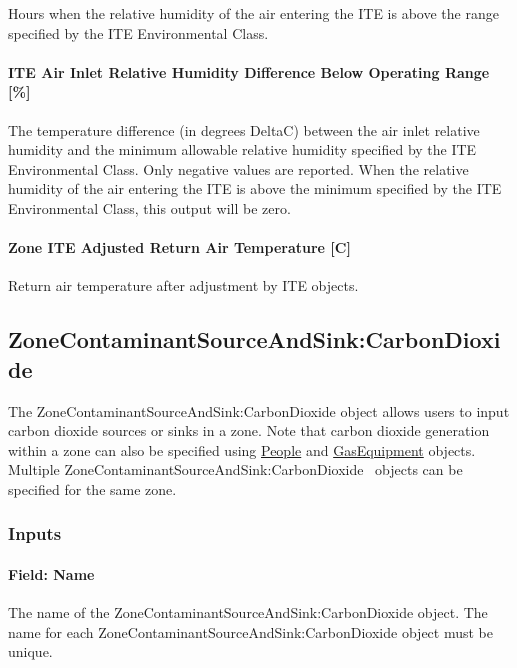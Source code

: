 Hours when the relative humidity of the air entering the ITE is above the range specified by the ITE Environmental Class.

\paragraph{ITE Air Inlet Relative Humidity Difference Below Operating Range {[}\%{]}}\label{ite-air-inlet-relative-humidity-difference-below-operating-range}

The temperature difference (in degrees DeltaC) between the air inlet relative humidity and the minimum allowable relative humidity specified by the ITE Environmental Class. Only negative values are reported. When the relative humidity of the air entering the ITE is above the minimum specified by the ITE Environmental Class, this output will be zero.

\paragraph{Zone ITE Adjusted Return Air Temperature [C]}

Return air temperature after adjustment by ITE objects.

\subsection{ZoneContaminantSourceAndSink:CarbonDioxide}\label{zonecontaminantsourceandsinkcarbondioxide}

The ZoneContaminantSourceAndSink:CarbonDioxide object allows users to input carbon dioxide sources or sinks in a zone. Note that carbon dioxide generation within a zone can also be specified using \hyperref[people]{People} and \hyperref[gasequipment]{GasEquipment} objects. Multiple ZoneContaminantSourceAndSink:CarbonDioxide~ objects can be specified for the same zone.

\subsubsection{Inputs}\label{inputs-10-008}

\paragraph{Field: Name}\label{field-name-10-007}

The name of the ZoneContaminantSourceAndSink:CarbonDioxide object. The name for each ZoneContaminantSourceAndSink:CarbonDioxide object must be unique.

